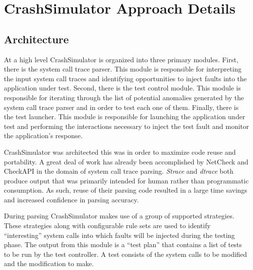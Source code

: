 \section{CrashSimulator Approach Details}


    \subsection{Architecture}

        At a high level CrashSimulator is organized into three primary modules. First, there is the system call trace
        parser. This module is responsible for interpreting the input system call traces and identifying opportunities
        to inject faults into the application under test. Second, there is the test control module. This module is
        responsible for iterating through the list of potential anomalies generated by the system call trace parser and
        in order to test each one of them. Finally, there is the test launcher. This module is responsible for launching
        the application under test and performing the interactions necessary to inject the test fault and monitor the
        application's response.

        CrashSimulator was architected this was in order to maximize code reuse and portability. A great deal of work
        has already been accomplished by NetCheck and CheckAPI in the domain of system call trace parsing. \emph{Strace}
        and \emph{dtrace} both produce output that was primarily intended for human rather than programmatic
        consumption. As such, reuse of their parsing code resulted in a large time savings and increased confidence in
        parsing accuracy.

        During parsing CrashSimulator makes use of a group of supported strategies. These strategies along with
        configurable rule sets are used to identify ``interesting'' system calls into which faults will be injected
        during the testing phase. The output from this module is a ``test plan'' that contains a list of tests to be run
        by the test controller. A test consists of the system calls to be modified and the modification to make.

